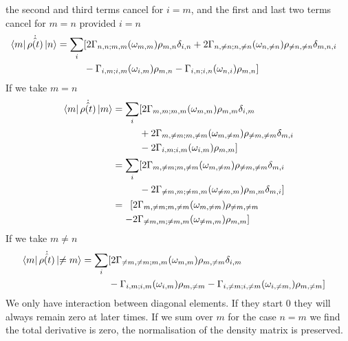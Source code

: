 the second and third terms cancel
for \(i=m\), and the first and
last two terms cancel for \(m=n\)
provided \(i = n\)
\begin{align}
    \bra{m}\dot{\hat{\rho{}(t)}} \ket{n} & = \begin{aligned}[t]
        \sum_{i} &
        [2 \Gamma_{n,n;m, m}(\omega_{m,m})\rho_{m, n}\delta_{i,n}
        + 2\Gamma_{n,\neq n;n, \neq n}(\omega_{n,\neq n})\rho_{\neq n, \neq n}\delta_{m,n, i} \\
                 &
                - \Gamma_{i,m;i, m}(\omega_{i,m})\rho_{m, n}
                - \Gamma_{ i,n;i,n}(\omega_{n,i})\rho_{m, n}]
    \end{aligned}
\end{align}
If we take \(m=n\)
\begin{align}
    \bra{m}\dot{\hat{\rho{}(t)}} \ket{m} & = \begin{aligned}[t]
        \sum_{i} &
        [2 \Gamma_{m,m;m, m}(\omega_{m,m})\rho_{m, m}\delta_{i,m}                          \\ &
        + 2\Gamma_{m,\neq m;m, \neq m}(\omega_{m,\neq m})\rho_{\neq m, \neq m}\delta_{m,i} \\
                 &
                - 2 \Gamma_{i,m;i, m}(\omega_{i,m})\rho_{m, m}]
    \end{aligned}                                                 \\
                                         & = \begin{aligned}[t]
        \sum_{i} &
        [2\Gamma_{m,\neq m;m, \neq m}(\omega_{m,\neq m})\rho_{\neq m, \neq m}\delta_{m,i} \\
                 &
                -2 \Gamma_{\neq m,m;\neq m, m}(\omega_{\neq m,m})\rho_{m, m}\delta_{m,i}]
    \end{aligned}                                                 \\
                                         & = \begin{aligned}[t]
        [ & 2\Gamma_{m,\neq m;m, \neq m}(\omega_{m,\neq m})\rho_{\neq m, \neq m} \\
        - & 2\Gamma_{\neq m,m;\neq m, m}(\omega_{\neq m,m})\rho_{m, m}]
    \end{aligned}\label{eqn:cross terms density matrix evolution}
\end{align}
If we take \(m \neq n\)
\begin{align}
    \bra{m}\dot{\hat{\rho{}(t)}} \ket{\neq m} & = \begin{aligned}[t]
        \sum_{i} &
        [2 \Gamma_{\neq m,\neq m;m, m}(\omega_{m,m})\rho_{m, \neq m}\delta_{i,m} \\
                 &
                - \Gamma_{i,m;i, m}(\omega_{i,m})\rho_{m, \neq m}
                - \Gamma_{ i,\neq m; i, \neq m}(\omega_{i, \neq m,})\rho_{m, \neq m}]
    \end{aligned}
\end{align}
We only have interaction
between diagonal elements.
If they start 0 they will
always remain zero at
later times. If we
sum over \(m\) for the
case \(n=m\) we find
the total derivative is
zero, the normalisation of
the density matrix is preserved.


